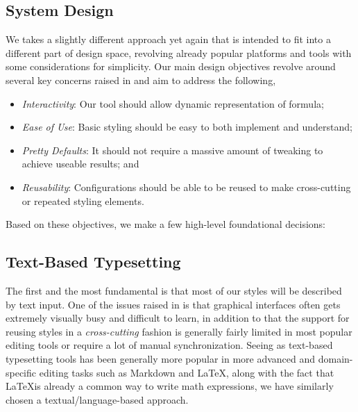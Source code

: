 \documentclass{article}
\begin{document}
\begin{multicols*}{2}
  \section*{System Design}
  We takes a slightly different approach yet again that is intended to fit into a different
  part of design space, revolving already popular platforms and tools with some considerations for simplicity.
  Our main design objectives revolve around several key concerns raised in
  \cite[Head et al.]{MAug} and aim to address the following,
  \begin{itemize}
    \item \textit{Interactivity}: Our tool should allow dynamic representation of formula;
    \item \textit{Ease of Use}: Basic styling should be easy to both implement and understand;
    \item \textit{Pretty Defaults}: It should not require a massive amount of tweaking to achieve useable results; and
    \item \textit{Reusability}: Configurations should be able to be reused to make cross-cutting or repeated styling elements.
  \end{itemize}
  Based on these objectives, we make a few high-level foundational decisions: \vspace*{-1ex}
  \subsection*{Text-Based Typesetting}
  The first and the most fundamental is that most of our styles will be described
  by text input. One of the issues raised in \cite[Head et al.]{MAug} is that graphical
  interfaces often gets extremely visually busy and difficult to learn, in addition to
  that the support for reusing styles in a \textit{cross-cutting} fashion
  is generally fairly limited in most popular editing tools or require a lot of manual
  synchronization. Seeing as text-based typesetting tools has been generally more popular
  in more advanced and domain-specific editing tasks such as Markdown and \LaTeX, along with
  the fact that \LaTeX is already a common way to write math expressions, we have
  similarly chosen a textual/language-based approach.

\end{multicols*}
\end{document}
